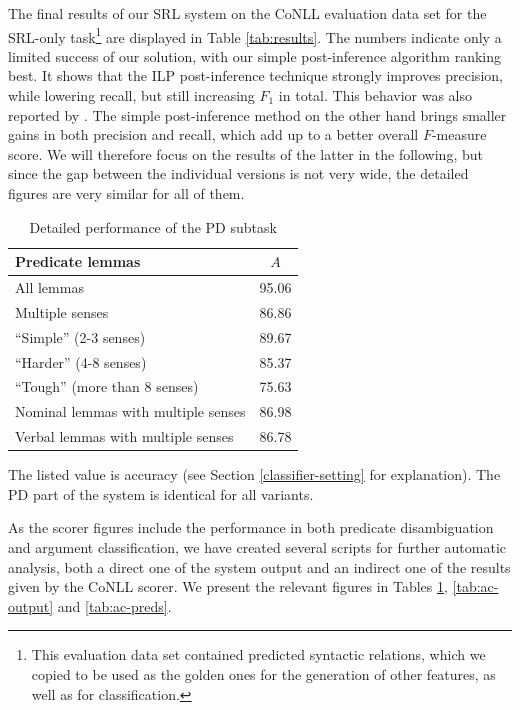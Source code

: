 \documentclass[12pt,notitlepage]{report}
\begin{document}
The final results of our SRL system on the CoNLL evaluation data set for the SRL-only task\footnote{This evaluation data set contained predicted syntactic relations, which we copied to be used as the golden ones for the generation of other features, as well as for classification.} are displayed in Table \ref{tab:results}. The numbers indicate only a limited success of our solution, with our simple post-inference algorithm ranking best. It shows that the ILP post-inference technique strongly improves precision, while lowering recall, but still increasing $F_1$ in total. This behavior was also reported by \citet{che09}. The simple post-inference method on the other hand brings smaller gains in both precision and recall, which add up to a better overall $F$-measure score. We will therefore focus on the results of the latter in the following, but since the gap between the individual versions is not very wide, the detailed figures are very similar for all of them.

\begin{table}[htb]\footnotesize
\caption{Detailed performance of the PD subtask}\label{tab:pd-output}
\begin{center}
\begin{tabular}{|l|c|}\hline
\bf Predicate lemmas & $A$ \\\hline
All lemmas & 95.06 \\
Multiple senses & 86.86 \\
``Simple'' (2-3 senses) & 89.67 \\
``Harder'' (4-8 senses) & 85.37 \\
``Tough'' (more than 8 senses) & 75.63 \\\hline 
Nominal lemmas with multiple senses & 86.98 \\
Verbal lemmas with multiple senses & 86.78 \\\hline
\end{tabular}
\end{center}
The listed value is accuracy (see Section \ref{classifier-setting} for explanation). The PD part of the system is identical for all variants.
\end{table}

As the scorer figures include the performance in both predicate disambiguation and argument classification, we have created several scripts for further automatic analysis, both a direct one of the system output and an indirect one of the results given by the CoNLL scorer. We present the relevant figures in Tables \ref{tab:pd-output}, \ref{tab:ac-output} and \ref{tab:ac-preds}.
\end{document}
